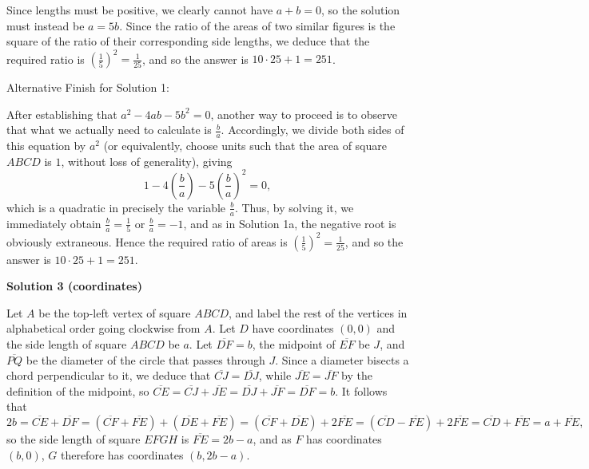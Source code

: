 \begin{enumerate}
 Since lengths must be positive, we clearly cannot have $a+b = 0$, so the solution must instead be $a = 5b$. Since the ratio of the areas of two similar figures is the square of the ratio of their corresponding side lengths, we deduce that the required ratio is $\left(\frac{1}{5}\right)^2 = \frac{1}{25}$, and so the answer is $10 \cdot 25 + 1 = \boxed{251}$.

 Alternative Finish for Solution 1:

 After establishing that $a^2-4ab-5b^2 = 0$, another way to proceed is to observe that what we actually need to calculate is $\frac{b}{a}$. Accordingly, we divide both sides of this equation by $a^2$ (or equivalently, choose units such that the area of square $ABCD$ is $1$, without loss of generality), giving
 \[1-4\left(\frac{b}{a}\right)-5\left(\frac{b}{a}\right)^2 = 0,\]which is a quadratic in precisely the variable $\frac{b}{a}$. Thus, by solving it, we immediately obtain $\frac{b}{a} = \frac{1}{5}$ or $\frac{b}{a} = -1$, and as in Solution 1a, the negative root is obviously extraneous. Hence the required ratio of areas is $\left(\frac{1}{5}\right)^2 = \frac{1}{25}$, and so the answer is $10 \cdot 25 + 1 = \boxed{251}$.

 


 



\textbf{Solution 3 (coordinates)}

Let $A$ be the top-left vertex of square $ABCD$, and label the rest of the vertices in alphabetical order going clockwise from $A$. Let $D$ have coordinates $(0,0)$ and the side length of square $ABCD$ be $a$. Let $\overline{DF} = b$, the midpoint of $\overline{EF}$ be $J$, and $\overline{PQ}$ be the diameter of the circle that passes through $J$. Since a diameter bisects a chord perpendicular to it, we deduce that $\overline{CJ} = \overline{DJ}$, while $\overline{JE} = \overline{JF}$ by the definition of the midpoint, so $\overline{CE} = \overline{CJ}+\overline{JE} = \overline{DJ}+\overline{JF} = \overline{DF} = b$. It follows that 
 \[2b = \overline{CE}+\overline{DF} = \left(\overline{CF}+\overline{FE}\right)+\left(\overline{DE}+\overline{FE}\right) = \left(\overline{CF}+\overline{DE}\right)+2\overline{FE} = \left(\overline{CD}-\overline{FE}\right)+2\overline{FE} = \overline{CD}+\overline{FE} = a+\overline{FE},\] so the side length of square $EFGH$ is $\overline{FE} = 2b-a$, and as $F$ has coordinates $(b,0)$, $G$ therefore has coordinates $(b,2b-a)$.


\end{enumerate}
